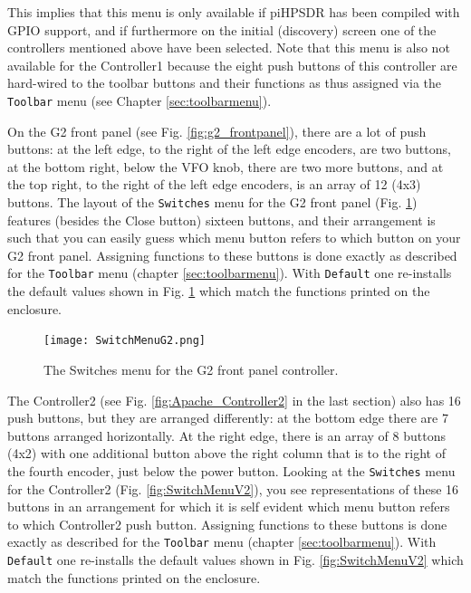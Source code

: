 \documentclass[12pt]{book}
\def\rett#1{\texttt{\color{red}#1}}
\def\bltt#1{\texttt{\color{blue}#1}}
\def\pH{pi\-HPSDR\xspace}
\begin{document}
This implies that this menu is only available if \pH has been compiled with GPIO support,
and if furthermore on the initial (discovery) screen one of the controllers mentioned above have
been selected. Note that this menu is also not available
for the Controller1 because the eight push buttons of this controller are hard-wired to
the toolbar buttons and their functions as thus assigned via the \bltt{Toolbar} menu
(see Chapter \ref{sec:toolbarmenu}).


On the G2 front panel (see Fig. \ref{fig:g2_frontpanel}),
there are a lot of push buttons: at the left edge, to the right
of the left edge encoders, are two buttons, at the bottom right, below the VFO knob,
there are two more buttons, and at the top right, to the right of the left edge
encoders, is an array of 12 (4x3) buttons. The layout of the \bltt{Switches} menu
for the G2 front panel (Fig. \ref{fig:SwitchMenuG2}) features (besides the Close
button) sixteen buttons, and their arrangement is such that you can easily guess
which menu button refers to which button on your G2 front panel. Assigning functions
to these buttons is done exactly as described for the \bltt{Toolbar} menu
(chapter \ref{sec:toolbarmenu}). With \rett{Default} one re-installs the default values
shown in Fig. \ref{fig:SwitchMenuG2} which match the functions printed on the enclosure.

\begin{figure}[ht]
\center
\texttt{[image: SwitchMenuG2.png]}
\caption{The Switches menu for the G2 front panel controller.}
\label{fig:SwitchMenuG2}
\end{figure}

The Controller2 (see Fig. \ref{fig:Apache_Controller2} in the last section)
also has 16 push buttons, but they are arranged differently:
at the bottom edge there are 7 buttons arranged horizontally. At the right
edge, there is an array of 8 buttons (4x2) with one additional button
above the right column that is to the right of the fourth encoder, just
below the power button. Looking at the \bltt{Switches} menu for the
Controller2 (Fig. \ref{fig:SwitchMenuV2}), you see representations of
these 16 buttons in an arrangement for which it is self evident which
menu button refers to which Controller2 push button.
Assigning functions
to these buttons is done exactly as described for the \bltt{Toolbar} menu
(chapter \ref{sec:toolbarmenu}).
With \rett{Default} one re-installs the default values
shown in Fig. \ref{fig:SwitchMenuV2} which match the functions printed on the enclosure.
\end{document}
